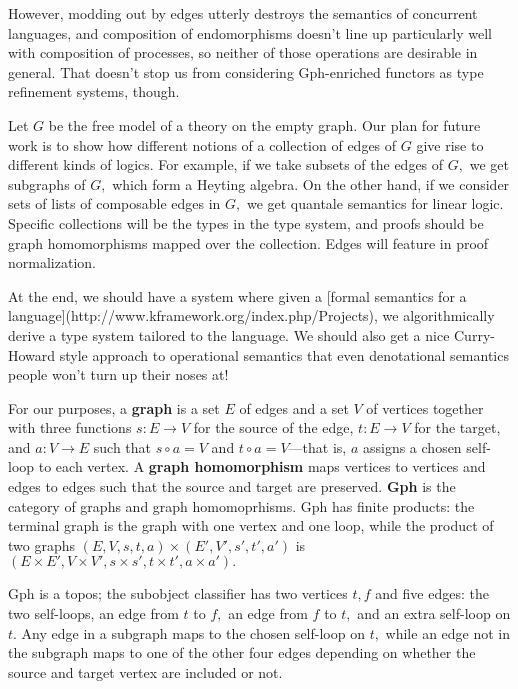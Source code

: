 \documentclass[a4paper,UKenglish]{article}
\begin{document}
However, modding out by edges utterly destroys the semantics of concurrent languages, and composition of endomorphisms doesn't line up particularly well with composition of processes, so neither of those operations are desirable in general.  That doesn't stop us from considering Gph-enriched functors as type refinement systems, though.

Let $G$ be the free model of a theory on the empty graph.  Our plan for future work is to show how different notions of a collection of edges of $G$ give rise to different kinds of logics.  For example, if we take subsets of the edges of $G,$ we get subgraphs of $G,$ which form a Heyting algebra.  On the other hand, if we consider sets of lists of composable edges in $G,$ we get quantale semantics for linear logic.  Specific collections will be the types in the type system, and proofs should be graph homomorphisms mapped over the collection. Edges will feature in proof normalization.

At the end, we should have a system where given a [formal semantics for a language](http://www.kframework.org/index.php/Projects), we algorithmically derive a type system tailored to the language.  We should also get a nice Curry-Howard style approach to operational semantics that even denotational semantics people won't turn up their noses at!



For our purposes, a {\bf graph} is a set $E$ of edges and a set $V$ of vertices together with three functions $s\colon E \to V$ for the source of the edge, $t\colon E \to V$ for the target, and $a\colon V \to E$ such that $s\circ a = V$ and $t \circ a = V$---that is, $a$
assigns a chosen self-loop to each vertex.  A {\bf graph homomorphism} maps vertices to vertices and edges to edges such that the source and target are preserved.  {\bf Gph} is the category of graphs and graph homomoprhisms.  Gph has finite products: the terminal graph is the graph with one vertex and one loop, while the product of two graphs $(E , V , s, t, a) \times (E' , V' , s' , t' , a')$ is $(E \times E',
V \times V', s \times s', t\times t', a \times a').$

Gph is a topos; the subobject classifier has two vertices $t, f$ and five edges: the two self-loops, an edge from $t$ to $f,$ an edge from $f$ to $t,$ and an extra self-loop on $t$.  Any edge in a subgraph
maps to the chosen self-loop on $t,$ while an edge not in the subgraph maps to one of the other four edges depending on whether the source and target vertex are included or not.
\end{document}
